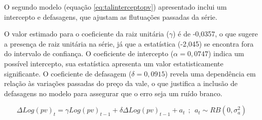 \documentclass[a4paper,12pt]{article}[abntex2]
\begin{document}
O segundo modelo (equação \ref{eq:talinterceptopv}) apresentado inclui um intercepto e defasagens, que ajustam as flutuações passadas da série.

O valor estimado para o coeficiente da raiz unitária ($\gamma$) é de -0,0357, o que sugere a presença de raiz unitária na série, já que a estatística (-2,045)  se encontra fora do intervalo de confiança. O coeficiente de intercepto ($\alpha = 0,0747$) indica um possível intercepto, sua estatística apresenta um valor estatisticamente significante. O coeficiente de defasagem ($\delta = 0,0915$) revela uma dependência em relação às variações passadas do preço da vale, o que justifica a inclusão de defasagens no modelo para assegurar que o erro seja um ruído branco.

\begin{equation}
    \Delta Log(pv)_t = \gamma Log(pv)_{t-1} + \delta \Delta Log(pv)_{t-1} + a_t \ \ ; \ \ a_t \sim RB(0, \sigma_a^2)   
    \label{eq:tallpv}
\end{equation}
\end{document}
